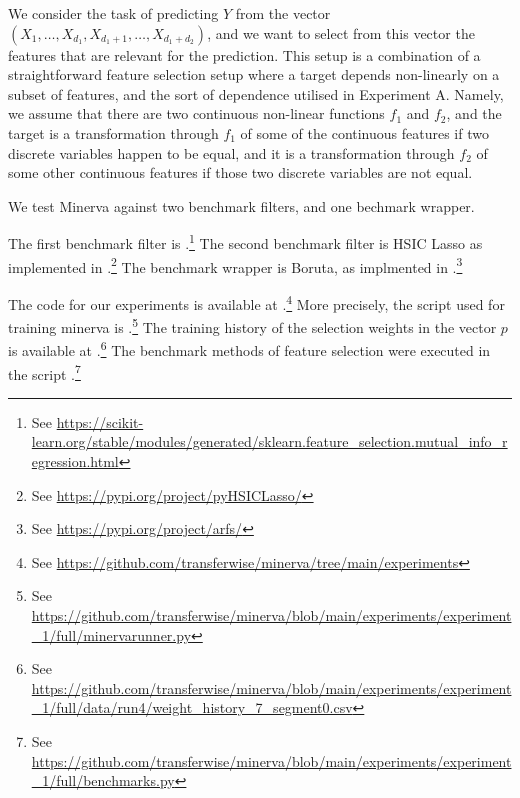 We consider the task of predicting $Y$ from the vector 
$(X_1, \dots, X_{d_1}, X_{d_1 + 1}, \dots, X_{d_1 + d_2})$,
and 
we want to select 
from this vector 
the features that are relevant for the prediction.
This setup is a combination of a 
straightforward feature selection setup 
where a target depends non-linearly on a subset of features,
and 
the sort of dependence utilised in Experiment A.
Namely,
we assume that 
there are two continuous non-linear functions $f_1$ and $f_2$,
and
the target is a transformation through $f_1$
of some of the continuous features if two discrete  variables happen to be equal,
and it is a transformation through $f_2$
of some other continuous features if those two discrete variables are not equal. 

We test 
Minerva
against two benchmark filters, 
and one bechmark wrapper.

The first benchmark filter is 
.\footnote{
See
\url{https://scikit-learn.org/stable/modules/generated/sklearn.feature\_selection.mutual\_info\_regression.html}
}
The second benchmark filter is
HSIC Lasso
as implemented in 
.\footnote{
See \url{https://pypi.org/project/pyHSICLasso/}
}
The benchmark wrapper is Boruta,
as implmented in
.\footnote{
See
\url{https://pypi.org/project/arfs/}
}


The code for our experiments is available 
at
.\footnote{
	See
\url{https://github.com/transferwise/minerva/tree/main/experiments}
}
More precisely, 
the script used for training minerva is
.\footnote{
	See
\url{https://github.com/transferwise/minerva/blob/main/experiments/experiment\_1/full/minervarunner.py}
}
The training history of the 
selection weights
in the vector $p$
is available at
.\footnote{
	See
\url{https://github.com/transferwise/minerva/blob/main/experiments/experiment\_1/full/data/run4/weight\_history\_7\_segment0.csv}
}
The benchmark methods of feature selection 
were
executed
in the script
.\footnote{
	See
\url{https://github.com/transferwise/minerva/blob/main/experiments/experiment\_1/full/benchmarks.py}
}



